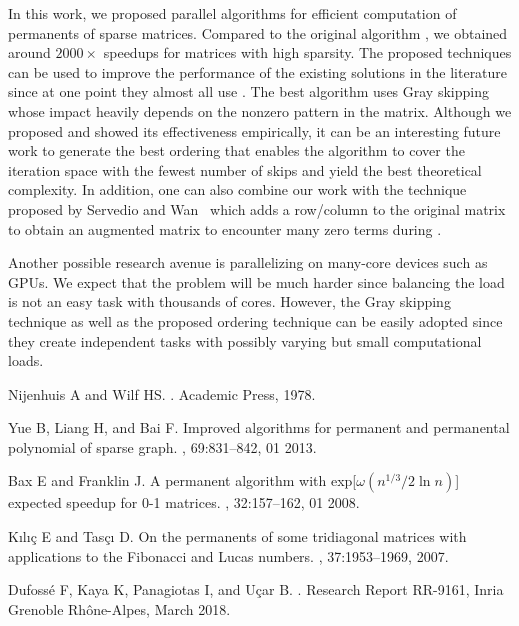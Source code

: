 \documentclass{elektr}
\begin{document}
{In this work, we proposed parallel algorithms for efficient computation of permanents of sparse matrices. Compared to the original algorithm {}, we obtained around $2000\times$ speedups for matrices with high sparsity. The proposed techniques can be used to improve the performance of the existing solutions in the literature since at one point they almost all use {}. The best algorithm {} uses Gray skipping whose impact heavily depends on the nonzero pattern in the matrix. Although we proposed {} and showed its effectiveness empirically, it can be an interesting future work to generate the best ordering that enables the algorithm to cover the iteration space with the fewest number of skips and yield the best theoretical complexity. In addition, one can also combine our work with the technique proposed by Servedio and Wan~\cite{servedio05} which adds a row/column to the original matrix to obtain an augmented matrix to encounter many zero terms during {}. 

Another possible research avenue is parallelizing {} on many-core devices such as GPUs. We expect that the problem will be much harder since balancing the load is not an easy task with thousands of cores. However, the Gray skipping technique as well as the proposed ordering technique can be easily adopted since they create independent tasks with possibly varying but small computational loads. 


\newpage
\begin{thebibliography}{10}

Nijenhuis A and Wilf HS.
.
\newblock Academic Press, 1978.

Yue B, Liang H, and Bai F.
\newblock Improved algorithms for permanent and permanental polynomial of
  sparse graph.
, 69:831--842, 01 2013.

Bax E and Franklin J.
\newblock A permanent algorithm with exp[$\omega(n^{1/3}/2\ln{n})$] expected
  speedup for 0-1 matrices.
, 32:157--162, 01 2008.

K{\i}l{\i}\c{c} E and Tas\c{c}{\i} D.
\newblock On the permanents of some tridiagonal matrices with applications to
  the {F}ibonacci and {L}ucas numbers.
, 37:1953--1969, 2007.

Dufoss{\'e} F, Kaya K, Panagiotas I, and U{\c c}ar B.
.
\newblock Research Report RR-9161, {Inria Grenoble Rh{\^o}ne-Alpes}, March
  2018.


\end{thebibliography}}
\end{document}
